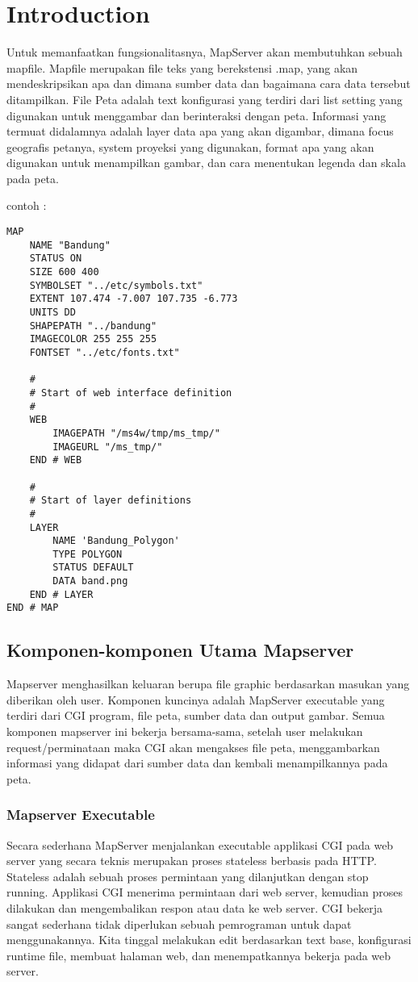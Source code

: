 ﻿\section{Introduction}

Untuk memanfaatkan fungsionalitasnya, MapServer akan membutuhkan sebuah mapfile. Mapfile merupakan file teks yang berekstensi .map,
yang akan mendeskripsikan apa dan dimana sumber data dan bagaimana cara data tersebut ditampilkan. 
File Peta adalah text konfigurasi yang terdiri dari list setting yang digunakan untuk menggambar dan berinteraksi dengan peta. 
Informasi yang termuat didalamnya adalah layer data apa yang akan digambar, dimana focus geografis petanya, 
system proyeksi yang digunakan, format apa yang akan digunakan untuk menampilkan gambar, dan cara menentukan legenda dan skala pada peta.

contoh :
\begin{verbatim}
MAP
    NAME "Bandung"
    STATUS ON
    SIZE 600 400
    SYMBOLSET "../etc/symbols.txt"
    EXTENT 107.474 -7.007 107.735 -6.773
    UNITS DD
    SHAPEPATH "../bandung"
    IMAGECOLOR 255 255 255
    FONTSET "../etc/fonts.txt"

    #
    # Start of web interface definition
    #
    WEB
        IMAGEPATH "/ms4w/tmp/ms_tmp/"
        IMAGEURL "/ms_tmp/"
    END # WEB

    #
    # Start of layer definitions
    #
    LAYER
        NAME 'Bandung_Polygon'
        TYPE POLYGON
        STATUS DEFAULT
        DATA band.png
    END # LAYER
END # MAP
\end{verbatim}

\subsection{Komponen-komponen Utama Mapserver}
Mapserver menghasilkan keluaran berupa file graphic berdasarkan masukan yang diberikan oleh user. Komponen kuncinya adalah MapServer executable yang terdiri dari CGI program, file peta, sumber data dan output gambar. Semua komponen mapserver ini bekerja bersama-sama, setelah user melakukan request/perminataan maka CGI akan mengakses file peta, menggambarkan informasi yang didapat dari sumber data dan kembali menampilkannya pada peta.
	\subsubsection {Mapserver Executable}
		Secara sederhana MapServer menjalankan executable applikasi CGI pada web server yang secara teknis merupakan proses 		stateless berbasis pada HTTP. Stateless adalah sebuah proses permintaan yang dilanjutkan dengan stop running. Applikasi CGI 		menerima permintaan dari web server, kemudian proses dilakukan dan mengembalikan respon atau data ke web server. CGI bekerja 		sangat sederhana tidak diperlukan sebuah pemrograman untuk dapat menggunakannya. Kita tinggal melakukan edit berdasarkan text 		base, konfigurasi runtime file, membuat halaman web, dan menempatkannya bekerja pada web server.

